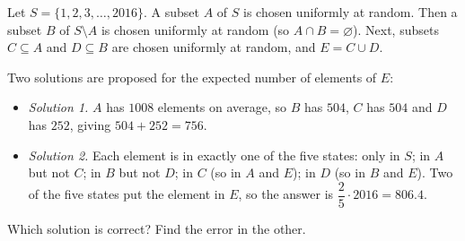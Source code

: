 Let $S=\{1,2,3,\dots,2016\}$. A subset $A$ of $S$ is chosen uniformly at random. Then a subset $B$ of $S\setminus A$ is chosen uniformly at random (so $A\cap B=\varnothing$). Next, subsets $C\subseteq A$ and $D\subseteq B$ are chosen uniformly at random, and $E=C\cup D$.

Two solutions are proposed for the expected number of elements of $E$:
\begin{itemize}
\item \emph{Solution 1.} $A$ has $1008$ elements on average, so $B$ has $504$, $C$ has $504$ and $D$ has $252$, giving $504+252=756$.
\item \emph{Solution 2.} Each element is in exactly one of the five states: only in $S$; in $A$ but not $C$; in $B$ but not $D$; in $C$ (so in $A$ and $E$); in $D$ (so in $B$ and $E$). Two of the five states put the element in $E$, so the answer is $\dfrac{2}{5}\cdot2016=806.4$.
\end{itemize}
Which solution is correct? Find the error in the other.
